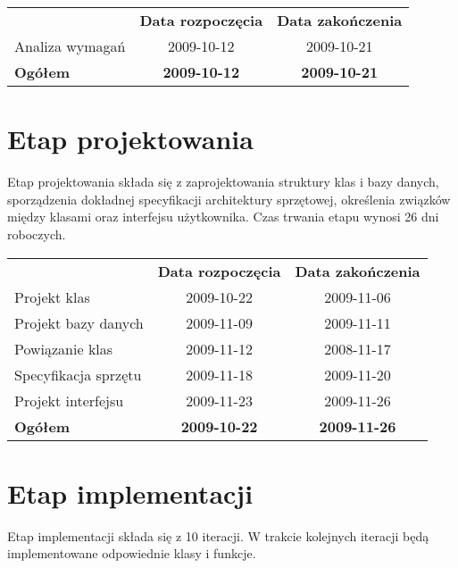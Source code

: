\documentclass[12pt,leqno,twoside]{mwart}
\begin{document}
		\begin{tabular}{m{8cm} c c}
		
		& \textbf{Data rozpoczęcia} & \textbf{Data zakończenia} \\ 
		Analiza wymagań & 2009-10-12 & 2009-10-21 \\ 
		\textbf{Ogółem} & \textbf{2009-10-12} & \textbf{2009-10-21} \\ 
		\end{tabular}

\section{Etap projektowania}
\noindent Etap projektowania składa się z zaprojektowania struktury klas i bazy danych, sporządzenia dokładnej specyfikacji architektury sprzętowej, określenia związków między klasami oraz interfejsu użytkownika. Czas trwania etapu wynosi 26 dni roboczych.\\

		\begin{tabular}{m{8cm} c c}
		
		& \textbf{Data rozpoczęcia} & \textbf{Data zakończenia} \\ 
		Projekt klas & 2009-10-22 & 2009-11-06 \\ 
		Projekt bazy danych & 2009-11-09 & 2009-11-11 \\ 
		Powiązanie klas & 2009-11-12 & 2008-11-17 \\ 
		Specyfikacja sprzętu & 2009-11-18 & 2009-11-20 \\ 
		Projekt interfejsu & 2009-11-23 & 2009-11-26 \\ 
		\textbf{Ogółem} & \textbf{2009-10-22} & \textbf{2009-11-26} \\ 
		\end{tabular}

\section{Etap implementacji}
\noindent Etap implementacji składa się z 10 iteracji. W trakcie kolejnych iteracji będą implementowane odpowiednie klasy i funkcje.\\
\end{document}
